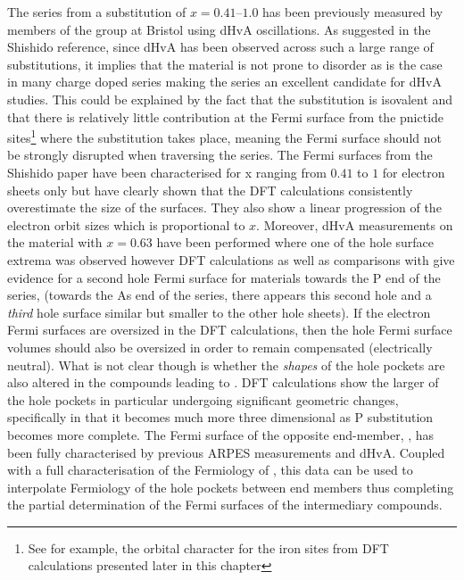 The \BaFePAs series from a substitution of $x=0.41$--$1.0$ has been previously measured by members of the group at Bristol using dHvA oscillations\cite{Shishido2010}. As suggested in the Shishido reference, since dHvA has been observed across such a large range of substitutions, it implies that the material is not prone to disorder as is the case in many charge doped series  making the series an excellent candidate for dHvA studies. This could be explained by the fact that the substitution is isovalent and that there is relatively little contribution at the Fermi surface from the pnictide sites\footnote{See for example, the orbital character for the iron sites from \ac{DFT} calculations presented later in this chapter} where the substitution takes place, meaning the Fermi surface should not be strongly disrupted when traversing the series. The Fermi surfaces from the Shishido paper have been characterised for x ranging from $0.41$ to $1$ for electron sheets only but have clearly shown that the DFT calculations consistently overestimate the size of the surfaces. They also show a linear progression of the electron orbit sizes which is proportional to $x$. Moreover, dHvA measurements on the material with $x=0.63$ have been performed where one of the hole surface extrema was observed\cite{Analytis2010c} however DFT calculations as well as comparisons with \SrFeP\cite{Analytis2009} give evidence for a second hole Fermi surface for materials towards the P end of the series, (towards the As end of the series, there appears this second hole and a \emph{third} hole surface similar but smaller to the other hole sheets). If the electron Fermi surfaces are oversized in the DFT calculations, then the hole Fermi surface volumes should also be oversized in order to remain compensated (electrically neutral). What is not clear though is whether the \emph{shapes} of the hole pockets are also altered in the compounds leading to \BaFeP. DFT calculations show the larger of the hole pockets in particular undergoing significant geometric changes, specifically in that it becomes much more three dimensional as P substitution becomes more complete. The Fermi surface of the opposite end-member, \BaFeAs, has been fully characterised by previous \ac{ARPES} measurements\cite{Kondo2010a} and dHvA\cite{Terashima2011, Analytis2010b}. Coupled with a full characterisation of the Fermiology of \BaFeP, this data can be used to interpolate Fermiology of the hole pockets between end members thus completing the partial determination of the Fermi surfaces of the intermediary compounds.

